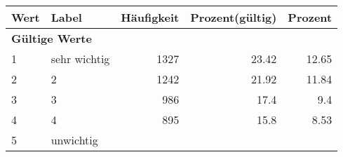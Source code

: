     \begin{longtable}{lXrrr}
     \toprule
     \textbf{Wert} & \textbf{Label} & \textbf{Häufigkeit} & \textbf{Prozent(gültig)} & \textbf{Prozent} \\
     \endhead
     \midrule
     \multicolumn{5}{l}{\textbf{Gültige Werte}}\\

     1 &
     \multicolumn{1}{X}{ sehr wichtig   } &


       \num{1327} &
       \num[round-mode=places,round-precision=2]{23,42} &
         \num[round-mode=places,round-precision=2]{12,65} \\

     2 &
     \multicolumn{1}{X}{ 2   } &


       \num{1242} &
       \num[round-mode=places,round-precision=2]{21,92} &
         \num[round-mode=places,round-precision=2]{11,84} \\

     3 &
     \multicolumn{1}{X}{ 3   } &


       \num{986} &
       \num[round-mode=places,round-precision=2]{17,4} &
         \num[round-mode=places,round-precision=2]{9,4} \\

     4 &
     \multicolumn{1}{X}{ 4   } &


       \num{895} &
       \num[round-mode=places,round-precision=2]{15,8} &
         \num[round-mode=places,round-precision=2]{8,53} \\

     5 &
     \multicolumn{1}{X}{ unwichtig   } &



\end{longtable}
